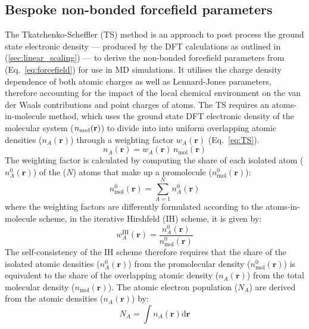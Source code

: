 \subsection{Bespoke non-bonded forcefield parameters}\label{sec:ddec}
%
The Tkatchenko-Scheffler (TS) method is an approach to post process the ground state electronic density --- produced by the DFT calculations as outlined in (\ref{sec:linear_scaling}) --- to derive the non-bonded forcefield parameters from (Eq.~\ref{eq:forcefield}) for use in MD simulations.\cite{tkatchenko2009accurate} It utilises the charge density dependence of both atomic charges as well as Lennard-Jones parameters, therefore accounting for the impact of the local chemical environment on the van der Waals contributions and point charges of atoms. The TS requires an atoms-in-molecule method, which uses the ground state DFT electronic density of the molecular system ($n_{\rm{mol}}(\mathbf{r})$) to divide into into uniform overlapping atomic densities ($n_{A}(\mathbf{r})$) through a weighting factor $w_{A}(\mathbf{r})$ (Eq.~\ref{eq:TS}).\cite{tkatchenko2009accurate,manz2012improved}
%
\begin{equation} \label{eq:TS}
n_{A}(\mathbf{r})=w_{A}(\mathbf{r})\,n_{\mathrm{mol}}(\mathbf{r})
\end{equation}
%
The weighting factor is calculated by computing the share of each isolated atom ($n_{A}^0(\mathbf{r})$) of the ($N$) atoms that make up a promolecule ($n_{\mathrm{mol}}^0(\mathbf{r})$):
\begin{equation}
    n_{\mathrm{mol}}^0(\mathbf{r}) = \sum_{A=1}^N n_{A}^0(\mathbf{r})
\end{equation}
where the weighting factors are differently formulated according to the atoms-in-molecule scheme, in the iterative Hirshfeld (IH) scheme,\cite{bultinck2007uniqueness} it is given by:
\begin{equation}
    w_{A}^{\mathrm{IH}}(\mathbf{r}) = \frac{n_{A}^0(\mathbf{r})}{n_{\mathrm{mol}}^0(\mathbf{r})}
\end{equation}
The self-consistency of the IH scheme therefore requires that the share of the isolated atomic densities ($n_{A}^0(\mathbf{r})$) from the promolecular density ($n_{\mathrm{mol}}^0(\mathbf{r})$) is equivalent to the share of the overlapping atomic density ($n_{A}(\mathbf{r})$) from the total molecular density ($n_{\mathrm{mol}}(\mathbf{r})$). The atomic electron population ($N_A$) are derived from the atomic densities ($n_{A}(\mathbf{r})$) by:
%
\begin{equation}
    N_A = \int n_A (\mathbf{r}) \mathrm{d}\mathbf{r}
\end{equation}
